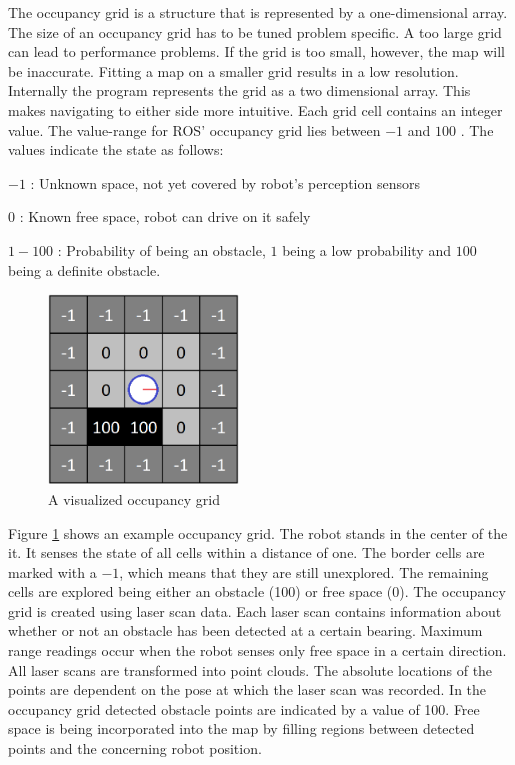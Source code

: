\documentclass{ba-kecs}
\begin{document}
The occupancy grid is a structure that is represented by a one-dimensional array. The size of an occupancy grid has to be tuned problem specific. A too large grid can lead to performance problems. If the grid is too small, however, the map will be inaccurate. Fitting a map on a smaller grid results in a low resolution.
Internally the program represents the grid as a two dimensional array. This makes navigating to either side more intuitive. Each grid cell contains an integer value. The value-range for ROS' occupancy grid lies between $-1$ and $100$ \cite{occupancy}. The values indicate the state as follows:
\begin{description}
\item{$-1$} : Unknown space, not yet covered by robot's perception sensors
\item{$0$} : Known free space, robot can drive on it safely
\item{$1-100$} : Probability of being an obstacle, $1$ being a low probability and $100$ being a definite obstacle.
\end{description}
\begin{figure}[htbp]
	\centering
		\includegraphics[width=0.45\textwidth]{figures/Occup.png}
	\caption{A visualized occupancy grid}
	\label{fig:Occupancy}
\end{figure}
Figure \ref{fig:Occupancy} shows an example occupancy grid. The robot stands in the center of the it. It senses the state of all cells within a distance of one. The border cells are marked with a $-1$, which means that they are still unexplored. The remaining cells are explored being either an obstacle (100) or free space (0).
The occupancy grid is created using laser scan data. Each laser scan contains information about whether or not an obstacle has been detected at a certain bearing. Maximum range readings occur when the robot senses only free space in a certain direction. All laser scans are transformed into point clouds. The absolute locations of the points are dependent on the pose at which the laser scan was recorded.
In the occupancy grid detected obstacle points are indicated by a value of 100.
Free space is being incorporated into the map by filling regions between detected points and the concerning robot position. 
\end{document}
